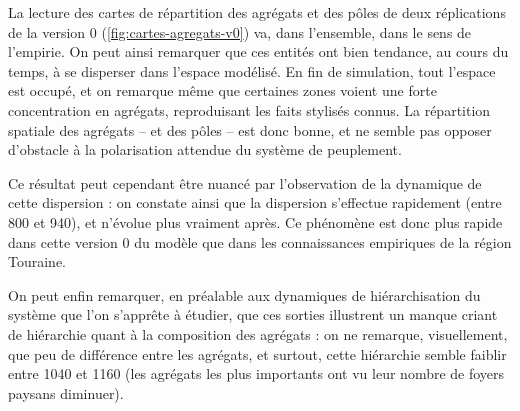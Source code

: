 \begin{mdframed}[backgroundcolor=gray!10,footnoteinside=false]
	La lecture des cartes de répartition des agrégats et des pôles de deux réplications de la version 0 (\cref{fig:cartes-agregats-v0}) va, dans l'ensemble, dans le sens de l'empirie.
On peut ainsi remarquer que ces entités ont bien tendance, au cours du temps, à se disperser dans l'espace modélisé.
En fin de simulation, tout l'espace est occupé, et on remarque même que certaines zones voient une forte concentration en agrégats, reproduisant les faits stylisés connus.
La répartition spatiale des agrégats -- et des pôles -- est donc bonne, et ne semble pas opposer d'obstacle à la polarisation attendue du système de peuplement.
	
	Ce résultat peut cependant être nuancé par l'observation de la dynamique de cette dispersion :
on constate ainsi que la dispersion s'effectue rapidement (entre 800 et 940), et n'évolue plus vraiment après.
Ce phénomène est donc plus rapide dans cette version 0 du modèle que dans les connaissances empiriques de la région Touraine.
	
	On peut enfin remarquer, en préalable aux dynamiques de hiérarchisation du système que l'on s'apprête à étudier, que ces sorties illustrent un manque criant de hiérarchie quant à la composition des agrégats :
on ne remarque, visuellement, que peu de différence entre les agrégats, et surtout, cette hiérarchie semble faiblir entre 1040 et 1160 (les agrégats les plus importants ont vu leur nombre de foyers paysans diminuer).
\end{mdframed}

